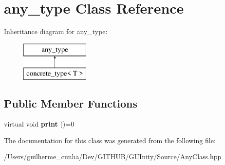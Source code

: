 \hypertarget{classany__type}{}\section{any\+\_\+type Class Reference}
\label{classany__type}
Inheritance diagram for any\+\_\+type\+:\begin{figure}[H]
\begin{center}
\leavevmode
\includegraphics[height=2.000000cm]{classany__type}
\end{center}
\end{figure}
\subsection*{Public Member Functions}
\begin{DoxyCompactItemize}
\item 
\hypertarget{classany__type_aa0c205b7997b79173ba337fd90be4922}{}virtual void {\bfseries print} ()=0\label{classany__type_aa0c205b7997b79173ba337fd90be4922}

\end{DoxyCompactItemize}


The documentation for this class was generated from the following file\+:\begin{DoxyCompactItemize}
\item 
/\+Users/guilherme\+\_\+cunha/\+Dev/\+G\+I\+T\+H\+U\+B/\+G\+U\+Inity/\+Source/Any\+Class.\+hpp\end{DoxyCompactItemize}
